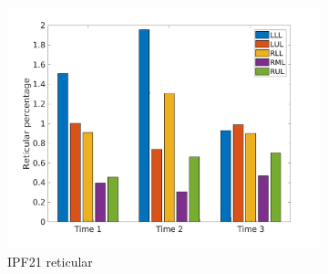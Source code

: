 \begin{figure}[H]
\begin{subfigure}{.46\linewidth}%
  \includegraphics[width=\linewidth,trim={{.0\wd0} {.0\wd0} {.0\wd0} {.0\wd0}},clip]{Appendix/Image_AppexA/LobarDistribution/IPF21ReticularLobarRegionDiseaseDistributionOverTime.jpg}
  \caption{IPF21 reticular}
  \label{fig:IPF21LobarRegionDiseaseDistributionOverTime-b}
\end{subfigure}
\begin{subfigure}{.46\linewidth}%

\end{subfigure}
\end{figure}
